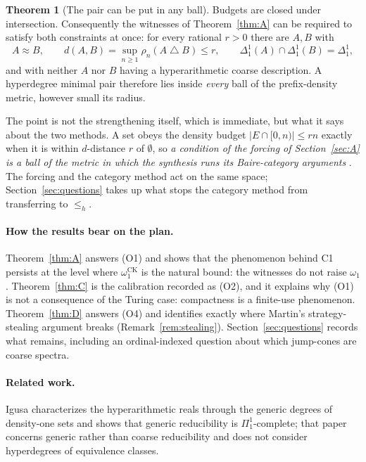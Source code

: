 \documentclass[11pt,letterpaper]{article}
\theoremstyle{definition}
\newtheorem{theorem}[definition]{Theorem}
\numberwithin{equation}{section}
\newcommand{\sd}{\mathbin{\triangle}}
\newcommand{\leh}{\le_{h}}
\newcommand{\Dh}{\Delta^1_1}
\newcommand{\omck}{\omega_1^{\mathrm{CK}}}
\begin{document}
\begin{theorem}[The pair can be put in any ball]\label{thm:E}
Budgets are closed under intersection. Consequently the witnesses of Theorem~\ref{thm:A} can be required to satisfy both constraints at once: for every rational $r>0$ there are $A,B$ with
\[
 A\approx B,\qquad d(A,B)=\sup_{n\ge1}\rho_n(A\sd B)\le r,\qquad
 \Dh(A)\cap\Dh(B)=\Dh,
\]
and with neither $A$ nor $B$ having a hyperarithmetic coarse description. A hyperdegree minimal pair therefore lies inside \emph{every} ball of the prefix-density metric, however small its radius.
\end{theorem}

The point is not the strengthening itself, which is immediate, but what it says about the two methods. A set obeys the density budget $|E\cap[0,n)|\le rn$ exactly when it is within $d$-distance $r$ of $\emptyset$, so \emph{a condition of the forcing of Section~\ref{sec:A} is a ball of the metric in which the synthesis runs its Baire-category arguments} \cite[Section~4]{Synthesis}. The forcing and the category method act on the same space; Section~\ref{sec:questions} takes up what stops the category method from transferring to $\leh$.

\paragraph{How the results bear on the plan.} Theorem~\ref{thm:A} answers (O1) and shows that the phenomenon behind C1 persists at the level where $\omck$ is the natural bound: the witnesses do not raise $\omega_1$. Theorem~\ref{thm:C} is the calibration recorded as (O2), and it explains why (O1) is not a consequence of the Turing case: compactness is a finite-use phenomenon. Theorem~\ref{thm:D} answers (O4) and identifies exactly where Martin's strategy-stealing argument breaks (Remark~\ref{rem:stealing}). Section~\ref{sec:questions} records what remains, including an ordinal-indexed question about which jump-cones are coarse spectra.

\paragraph{Related work.} Igusa \cite{IgusaHyp} characterizes the hyperarithmetic reals through the generic degrees of density-one sets and shows that generic reducibility is $\Pi^1_1$-complete; that paper concerns generic rather than coarse reducibility and does not consider hyperdegrees of equivalence classes.
\end{document}
